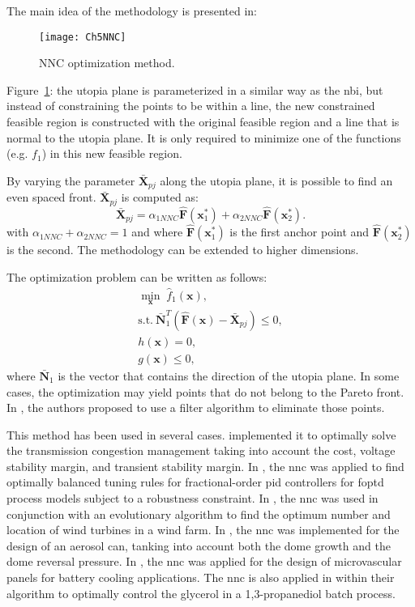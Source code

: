 The main idea of the methodology is presented in:
%
\begin{figure}[b]%
	\centering
	\texttt{[image: Ch5NNC]}%
	\caption{NNC optimization method.}%
	\label{fig:NNC}%
\end{figure}
%
Figure~\ref{fig:NNC}: the utopia plane is parameterized in a similar way as the \gls{nbi}, but instead of constraining the points to be within a line, the new constrained feasible region is constructed with the original feasible region and a line that is normal to the utopia plane. It is only required to minimize one of the functions (e.g. $f_{1}$) in this new feasible region.

By varying the parameter $\bar{\mathbf{X}}_{pj}$ along the utopia plane, it is possible to find an even spaced front. $\bar{\mathbf{X}}_{pj}$ is computed as:%
%
\begin{equation}
\bar{\mathbf{X}}_{pj}= \alpha_{1NNC} \mathbf{\hat{F}}(\mathbf{x}_1^*)+\alpha_{2NNC} \mathbf{\hat{F}}(\mathbf{x}_2^*).
\label{eq:Xpj}
\end{equation}%
%
with $\alpha_{1NNC}+\alpha_{2NNC}=1$ and where $\mathbf{\hat{F}}(\mathbf{x}_1^*)$ is the first anchor point and $\mathbf{\hat{F}}(\mathbf{x}_2^*)$ is the second. The methodology can be extended to higher dimensions.

The optimization problem can be written as follows:
%
\begin{equation}
\begin{gathered}
\min_{\mathbf{x}}{\; \hat{f}_{1}(\mathbf{x})}, \\
\text{s.t.} \ \bar{\mathbf{N}}_1^T \left(\hat{\mathbf{F}}(\mathbf{x})-\bar{\mathbf{X}}_{pj}\right) \leq 0,\\
h(\mathbf{x})=0, \\
g(\mathbf{x}) \leq 0,
\end{gathered}
\label{eq:NNCProblem}
\end{equation}
%
where $\bar{\mathbf{N}}_1$ is the vector that contains the direction of the utopia plane. In some cases, the optimization may yield points that do not belong to the Pareto front. In \citet{Messac2003}, the authors proposed to use a filter algorithm to eliminate those points.

This method has been used in several cases. \citet{Hosseini2016a}  implemented it to optimally solve the transmission congestion management taking into account the cost, voltage stability margin, and transient stability margin. In \citet{Sanchez2017a}, the \gls{nnc} was applied to find optimally balanced tuning rules for fractional-order \gls{pid} controllers for \gls{foptd} process models subject to a robustness constraint. In \citet{Mittal2017a}, the \gls{nnc} was used in conjunction with an evolutionary algorithm to find the optimum number and location of wind turbines in a wind farm. In \citet{Benki2018}, the \gls{nnc} was implemented for the design of an aerosol can, tanking into account both the dome growth and the dome reversal pressure. In \citet{Tan2018a}, the \gls{nnc} was applied for the design of microvascular panels for battery cooling applications. The \gls{nnc} is also applied in \citet{Liu2019} within their algorithm to optimally control the glycerol in a 1,3-propanediol batch process.


